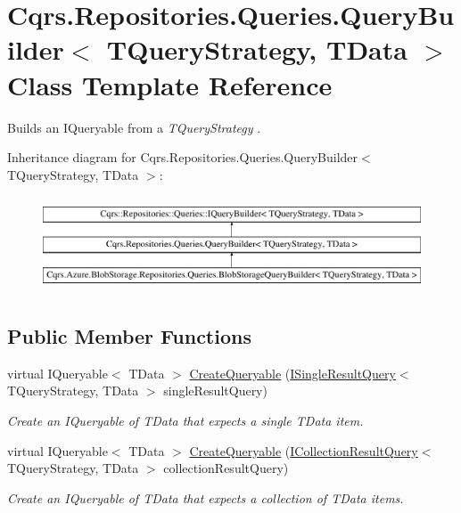 \hypertarget{classCqrs_1_1Repositories_1_1Queries_1_1QueryBuilder}{}\section{Cqrs.\+Repositories.\+Queries.\+Query\+Builder$<$ T\+Query\+Strategy, T\+Data $>$ Class Template Reference}
\label{classCqrs_1_1Repositories_1_1Queries_1_1QueryBuilder}


Builds an I\+Queryable from a {\itshape T\+Query\+Strategy} .  


Inheritance diagram for Cqrs.\+Repositories.\+Queries.\+Query\+Builder$<$ T\+Query\+Strategy, T\+Data $>$\+:\begin{figure}[H]
\begin{center}
\leavevmode
\includegraphics[height=2.876712cm]{classCqrs_1_1Repositories_1_1Queries_1_1QueryBuilder}
\end{center}
\end{figure}
\subsection*{Public Member Functions}
\begin{DoxyCompactItemize}
\item 
virtual I\+Queryable$<$ T\+Data $>$ \hyperlink{classCqrs_1_1Repositories_1_1Queries_1_1QueryBuilder_a6b103726f538e81ca0489a51b1aa3c88_a6b103726f538e81ca0489a51b1aa3c88}{Create\+Queryable} (\hyperlink{interfaceCqrs_1_1Repositories_1_1Queries_1_1ISingleResultQuery}{I\+Single\+Result\+Query}$<$ T\+Query\+Strategy, T\+Data $>$ single\+Result\+Query)
\begin{DoxyCompactList}\small\item\em Create an I\+Queryable of {\itshape T\+Data}  that expects a single {\itshape T\+Data}  item. \end{DoxyCompactList}\item 
virtual I\+Queryable$<$ T\+Data $>$ \hyperlink{classCqrs_1_1Repositories_1_1Queries_1_1QueryBuilder_af8860edf3677cb80ae481f17ff2db9b5_af8860edf3677cb80ae481f17ff2db9b5}{Create\+Queryable} (\hyperlink{interfaceCqrs_1_1Repositories_1_1Queries_1_1ICollectionResultQuery}{I\+Collection\+Result\+Query}$<$ T\+Query\+Strategy, T\+Data $>$ collection\+Result\+Query)
\begin{DoxyCompactList}\small\item\em Create an I\+Queryable of {\itshape T\+Data}  that expects a collection of {\itshape T\+Data}  items. \end{DoxyCompactList}\end{DoxyCompactItemize}
